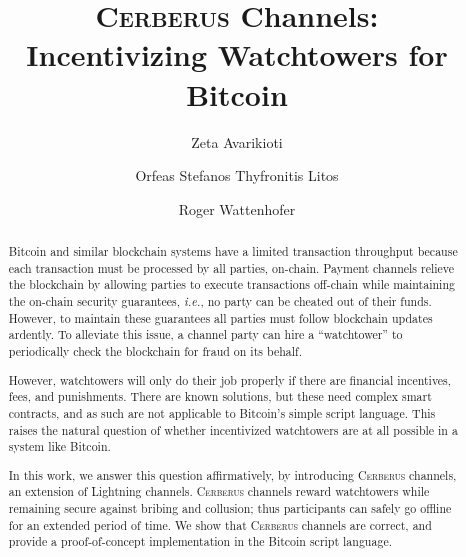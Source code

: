 \documentclass[runningheads]{llncs}
\newcommand{\ie}{{\em i.e.}}
\newcommand{\sys}{\textsc{Cerberus}\xspace}
\begin{document}
\title{\sys Channels: \\ Incentivizing Watchtowers for Bitcoin}
\titlerunning{\sys channels}
%
\author{Zeta Avarikioti \and
Orfeas Stefanos Thyfronitis Litos \and Roger Wattenhofer}
%
%
%

\date{}
\maketitle

%
%
\begin{abstract}
Bitcoin and similar blockchain systems have a limited transaction throughput because each transaction must be processed by all parties, on-chain.
Payment channels relieve the blockchain by allowing parties to execute transactions off-chain while maintaining the on-chain security guarantees, \ie, no party can be cheated out of their funds. However, to maintain these guarantees all parties must follow blockchain updates ardently.
To alleviate this issue, a channel party can hire a ``watchtower'' to periodically check the blockchain for fraud on its behalf.

However, watchtowers will only do their job properly if there are financial incentives, fees, and punishments. There are known solutions, but these need complex smart contracts, and as such are not applicable to Bitcoin's simple script language. This raises the natural question of whether incentivized watchtowers are at all possible in a system like Bitcoin.

In this work, we answer this question affirmatively, by introducing \sys channels, an extension of Lightning channels. \sys channels reward watchtowers while remaining secure against bribing and collusion; thus participants can safely go offline for an extended period of time.
We show that \sys channels are correct, and provide a proof-of-concept implementation in the Bitcoin script language.

\end{abstract}
\end{document}
